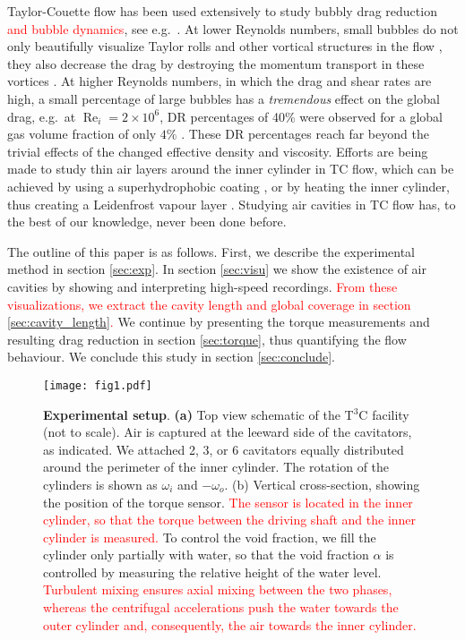 \documentclass[aps,onecolumn,10pt, floatfix, superscriptaddress,longbibliography, pra]{revtex4-1}
\newcommand{\red}[1]{\textcolor{red}{#1}}
\renewcommand{\Re}{\operatorname{Re}}
\begin{document}
Taylor-Couette flow has been used extensively to study bubbly drag reduction \red{ and bubble dynamics}, see e.g.\ \citet{Djeridi2004, climent2007, ber05, ber07, mur05,mur08,sug08b, gil13,cho14,fokoua2015, ver16}. At lower Reynolds numbers, small bubbles do not only beautifully visualize Taylor rolls and other vortical structures in the flow \citep{Ruymbeke2017}, they also decrease the drag by destroying the momentum transport in these vortices \citep{Spandan2016}. At higher Reynolds numbers, in which the drag and shear rates are high, a small percentage of large bubbles has a {\it tremendous} effect on the global drag, e.g.\ at $\Re_i=2\times 10^6$, DR percentages of 40\% were observed for a global gas volume fraction of only $4\%$ \citep{gil13}. These DR percentages reach far beyond the trivial effects of the changed effective density and viscosity.
Efforts are being made to study thin air layers around the inner cylinder in TC flow, which can be achieved by using a superhydrophobic coating \citep{sri15,ros16}, or by heating the inner cylinder, thus creating a Leidenfrost vapour layer \citep{sar16}. Studying air cavities in TC flow has, to the best of our knowledge, never been done before.

The outline of this paper is as follows. First, we describe the experimental method in section \ref{sec:exp}. In section \ref{sec:visu} we show the existence of air cavities by showing and interpreting high-speed recordings. \red{From these visualizations, we extract the cavity length and global coverage in section \ref{sec:cavity_length}.} We continue by presenting the torque measurements and resulting drag reduction in section \ref{sec:torque}, thus quantifying the flow behaviour. We conclude this study in section \ref{sec:conclude}.

\begin{figure}[htp]
\centering
\texttt{[image: fig1.pdf]}
\caption{{\bf Experimental setup}. {\bf (a)} Top view schematic of the T$^3$C facility (not to scale). Air is captured at the leeward side of the cavitators, as indicated. We attached 2, 3, or 6 cavitators equally distributed around the perimeter of the inner cylinder. The rotation of the cylinders is shown as $\omega_i$ and $-\omega_o.$ (b) Vertical cross-section, showing the position of the torque sensor. \red{The sensor is located in the inner cylinder, so that the torque between the driving shaft and the inner cylinder is measured.} To control the void fraction, we fill the cylinder only partially with water, so that the void fraction $\alpha$ is controlled by measuring the relative height of the water level. \red{Turbulent mixing ensures axial mixing between the two phases, whereas the centrifugal accelerations push the water towards the outer cylinder and, consequently, the air towards the inner cylinder.}}
\label{Chap_Six_fig:setup}
\end{figure}
\end{document}
